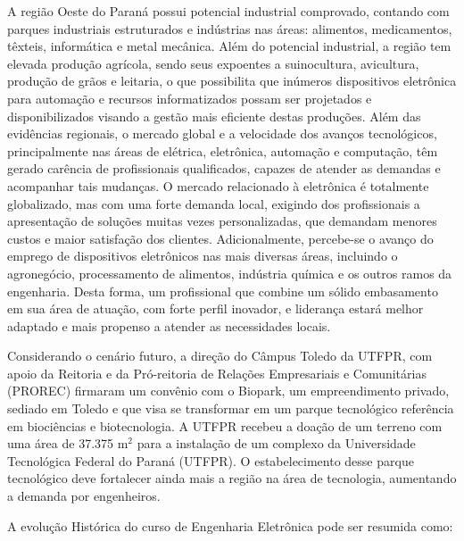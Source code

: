 
A região Oeste do Paraná possui potencial industrial comprovado, contando com parques industriais estruturados e indústrias nas áreas: alimentos, medicamentos, têxteis, informática e metal mecânica. Além do potencial industrial, a região tem elevada produção agrícola, sendo seus expoentes a suinocultura, avicultura, produção de grãos e leitaria, o que possibilita que inúmeros dispositivos eletrônica para automação e recursos informatizados possam ser projetados e disponibilizados visando a gestão mais eficiente destas produções. Além das evidências regionais, o mercado global e a velocidade dos avanços tecnológicos, principalmente nas áreas de elétrica, eletrônica, automação e computação, têm gerado carência de profissionais qualificados, capazes de atender as demandas e acompanhar tais mudanças. O mercado relacionado à eletrônica é totalmente globalizado, mas com uma forte demanda local, exigindo dos profissionais a apresentação de soluções muitas vezes personalizadas, que demandam menores custos e maior satisfação dos clientes. Adicionalmente, percebe-se o avanço do emprego de dispositivos eletrônicos nas mais diversas áreas, incluindo o agronegócio, processamento de alimentos, indústria química e os outros ramos da engenharia. Desta forma, um profissional que combine um sólido embasamento em sua área de atuação, com forte perfil inovador, e liderança estará melhor adaptado e mais propenso a atender as necessidades locais.

Considerando o cenário futuro, a direção do Câmpus Toledo da UTFPR, com apoio da Reitoria e da Pró-reitoria de Relações Empresariais e Comunitárias (PROREC) firmaram um convênio com o Biopark, um empreendimento privado, sediado em Toledo e que visa se transformar em um parque tecnológico referência em biociências e biotecnologia. A UTFPR recebeu a doação de um terreno com uma área de 37.375 m$^2$ para a instalação de um complexo da Universidade Tecnológica Federal do Paraná (UTFPR). O estabelecimento desse parque tecnológico deve fortalecer ainda mais a região na área de tecnologia, aumentando a demanda por engenheiros. 


A evolução Histórica do curso de Engenharia Eletrônica pode ser resumida como:

